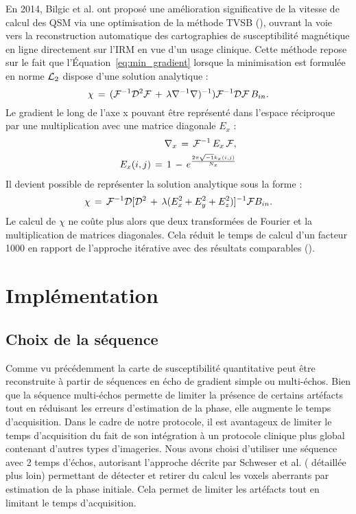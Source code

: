 {En 2014, Bilgic et al. ont proposé une amélioration significative de la vitesse de calcul des QSM
via une optimisation de la méthode TVSB (\cite{Bilgic2013}), ouvrant la voie vers la reconstruction automatique des
cartographies de susceptibilité magnétique en ligne directement sur l’IRM en vue d’un usage clinique.
Cette méthode repose sur le fait que l’Équation~\ref{eq:min_gradient} lorsque la minimisation est formulée en norme ${\cal L}_2$
dispose d’une solution analytique :
\begin{equation}
\label{eq:bilgicanal}
\chi\,= \,({\cal F}^{-1}{\cal D}^{2}{\cal F}\,+\,\lambda\nabla^{-1}\nabla)^{-1}){\cal F}^{-1}{\cal D}{\cal F}\,B_{in}.
\end{equation}
Le gradient le long de l’axe x pouvant être représenté dans l’espace réciproque par une multiplication
avec une matrice diagonale $E_x$ :
\begin{eqnarray}
\nabla_x\,=\,{\cal F}^{-1}\,E_x\,{\cal F},\\
E_x(i,j)\,=\,1\,-\,e^{\frac{2\pi\sqrt{-1}k_x(i,j)}{N_x}}
\end{eqnarray}
Il devient possible de représenter la solution analytique sous la forme :
\begin{equation}
\chi\,=\,{\cal F}^{-1}{\cal D}[{\cal D}^2\,+\,\lambda(E_x^2+E_y^2+E_z^2)]^{-1}{\cal F}B_{in}.
\end{equation}
Le calcul de $\chi$ ne coûte plus alors que deux transformées de Fourier et la multiplication de matrices
diagonales. Cela réduit le temps de calcul d’un facteur 1000 en rapport de l’approche itérative avec
des résultats comparables (\cite{Bilgic2013}).
\section{Implémentation}
\subsection{Choix de la séquence}
Comme vu précédemment la carte de susceptibilité quantitative peut être reconstruite à partir
de séquences en écho de gradient simple ou multi-échos. Bien que la séquence multi-échos permette
de limiter la présence de certains artéfacts tout en réduisant les erreurs d’estimation de la phase, elle
augmente le temps d’acquisition. Dans le cadre de notre protocole, il est avantageux de limiter le
temps d’acquisition du fait de son intégration à un protocole clinique plus global contenant d’autres
types d’imageries. Nous avons choisi d’utiliser une séquence avec 2 temps d’échos, autorisant
l’approche décrite par Schweser et al. (\cite{Schweser2011} détaillée plus loin) permettant de détecter et retirer du
calcul les voxels aberrants par estimation de la phase initiale. Cela permet de limiter les artéfacts tout
en limitant le temps d’acquisition.

}
